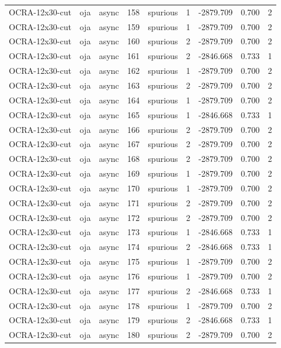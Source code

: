 \begin{tabular}{lllrlrrrr}
OCRA-12x30-cut & oja & async & 158 & spurious & 1 & -2879.709 & 0.700 & 2 \\
OCRA-12x30-cut & oja & async & 159 & spurious & 1 & -2879.709 & 0.700 & 2 \\
OCRA-12x30-cut & oja & async & 160 & spurious & 2 & -2879.709 & 0.700 & 2 \\
OCRA-12x30-cut & oja & async & 161 & spurious & 2 & -2846.668 & 0.733 & 1 \\
OCRA-12x30-cut & oja & async & 162 & spurious & 1 & -2879.709 & 0.700 & 2 \\
OCRA-12x30-cut & oja & async & 163 & spurious & 2 & -2879.709 & 0.700 & 2 \\
OCRA-12x30-cut & oja & async & 164 & spurious & 1 & -2879.709 & 0.700 & 2 \\
OCRA-12x30-cut & oja & async & 165 & spurious & 1 & -2846.668 & 0.733 & 1 \\
OCRA-12x30-cut & oja & async & 166 & spurious & 2 & -2879.709 & 0.700 & 2 \\
OCRA-12x30-cut & oja & async & 167 & spurious & 2 & -2879.709 & 0.700 & 2 \\
OCRA-12x30-cut & oja & async & 168 & spurious & 2 & -2879.709 & 0.700 & 2 \\
OCRA-12x30-cut & oja & async & 169 & spurious & 1 & -2879.709 & 0.700 & 2 \\
OCRA-12x30-cut & oja & async & 170 & spurious & 1 & -2879.709 & 0.700 & 2 \\
OCRA-12x30-cut & oja & async & 171 & spurious & 2 & -2879.709 & 0.700 & 2 \\
OCRA-12x30-cut & oja & async & 172 & spurious & 2 & -2879.709 & 0.700 & 2 \\
OCRA-12x30-cut & oja & async & 173 & spurious & 1 & -2846.668 & 0.733 & 1 \\
OCRA-12x30-cut & oja & async & 174 & spurious & 2 & -2846.668 & 0.733 & 1 \\
OCRA-12x30-cut & oja & async & 175 & spurious & 1 & -2879.709 & 0.700 & 2 \\
OCRA-12x30-cut & oja & async & 176 & spurious & 1 & -2879.709 & 0.700 & 2 \\
OCRA-12x30-cut & oja & async & 177 & spurious & 2 & -2846.668 & 0.733 & 1 \\
OCRA-12x30-cut & oja & async & 178 & spurious & 1 & -2879.709 & 0.700 & 2 \\
OCRA-12x30-cut & oja & async & 179 & spurious & 2 & -2846.668 & 0.733 & 1 \\
OCRA-12x30-cut & oja & async & 180 & spurious & 2 & -2879.709 & 0.700 & 2 \\

\end{tabular}
